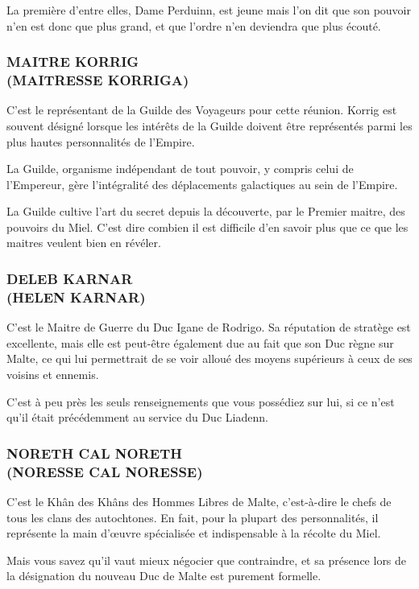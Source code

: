 \documentclass[14pt,twocolumn]{extarticle}
\begin{document}
La première d'entre elles, Dame Perduinn, est jeune mais l'on dit que son
pouvoir n'en est donc que plus grand, et que l'ordre n'en deviendra que plus
écouté.

\subsubsection{MAITRE KORRIG\\(MAITRESSE KORRIGA)}

C'est le représentant de la Guilde des Voyageurs pour cette réunion. Korrig
est souvent désigné lorsque les intérêts de la Guilde doivent être représentés
parmi les plus hautes personnalités de l'Empire.

La Guilde, organisme indépendant de tout pouvoir, y compris celui de
l'Empereur, gère l'intégralité des déplacements galactiques au sein de
l'Empire.

La Guilde cultive l'art du secret depuis la découverte, par le Premier maitre,
des pouvoirs du Miel. C'est dire combien il est difficile d'en savoir plus que
ce que les maitres veulent bien en révéler.

\subsubsection{DELEB KARNAR\\(HELEN KARNAR)}

C'est le Maitre de Guerre du Duc Igane de Rodrigo. Sa réputation de stratège
est excellente, mais elle est peut-être également due au fait que son Duc règne
sur Malte, ce qui lui permettrait de se voir alloué des moyens supérieurs à
ceux de ses voisins et ennemis.

C'est à peu près les seuls renseignements que vous possédiez sur lui, si ce
n'est qu'il était précédemment au service du Duc Liadenn.

\subsubsection{NORETH CAL NORETH\\(NORESSE CAL NORESSE)}

C'est le Khân des Khâns des Hommes Libres de Malte, c'est-à-dire le chefs de
tous les clans des autochtones. En fait, pour la plupart des personnalités, il
représente la main d'œuvre spécialisée et indispensable à la récolte du Miel.

Mais vous savez qu'il vaut mieux négocier que contraindre, et sa présence lors
de la désignation du nouveau Duc de Malte est purement formelle.
\end{document}
